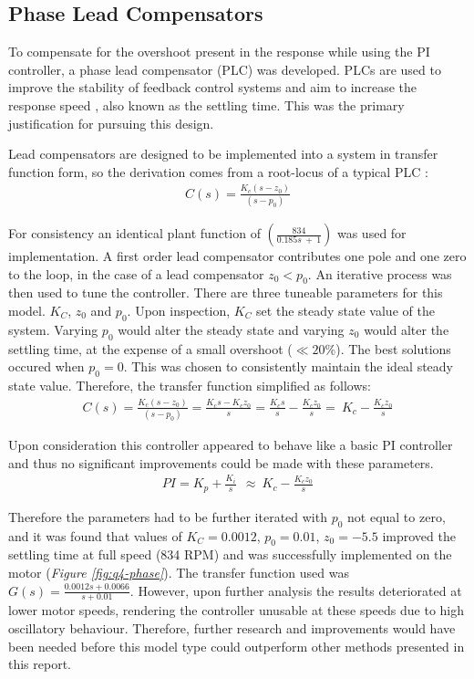 \documentclass[11pt, onecolumn]{article}
\begin{document}
\subsection*{Phase Lead Compensators}
\par To compensate for the overshoot present in the response while using the PI controller, a phase lead compensator (PLC) was developed. PLCs are used to improve the stability of feedback control systems and aim to increase the response speed \cite{sciencedirectLeadCompensator}, also known as the settling time. This was the primary justification for pursuing this design.
\par Lead compensators are designed to be implemented into a system in transfer function form, so the derivation comes from a root-locus of a typical PLC \cite{umichControlTutorials1}:
\begin{align*}
    C(s)=\frac{K_c(s-z_0)}{(s-p_0)}
\end{align*}
\par For consistency an identical plant function  of $(\frac{834}{0.185s\ +\ 1})$ was used for implementation. A first order lead compensator contributes one pole and one zero to the loop, in the case of a lead compensator $z_0<p_0$. An iterative process was then used to tune the controller. There are three tuneable parameters for this model. $K_C$, $z_0$ and $p_0$. Upon inspection, $K_C$ set the steady state value of the system. Varying $p_0$ would alter the steady state and varying $z_0$ would alter the settling time, at the expense of a small overshoot ($\ll20$\%). The best solutions occured when $p_0=0$. This was chosen to consistently maintain the ideal steady state value. Therefore, the transfer function simplified as follows:
\begin{align*}
    C\left(s\right)=\frac{K_c\left(s-z_0\right)}{(s-p_0)}=\frac{K_cs-K_cz_0}{s}=\frac{K_cs}{s}-\frac{K_cz_0}{s}=\ K_c-\frac{K_cz_0}{s}
\end{align*}
\par Upon consideration this controller appeared to behave like a basic PI controller and thus no significant improvements could be made with these parameters.
\begin{align*}
    PI=K_p+\frac{K_i}{s}\ \ \approx\ K_c-\frac{K_cz_0}{s}
\end{align*}
\par Therefore the parameters had to be further iterated with $p_0$ not equal to zero, and it was found that values of $K_C = 0.0012$, $p_0= 0.01$, $z_0= -5.5$ improved the settling time at full speed (834 RPM) and was successfully implemented on the motor (\textit{Figure \ref{fig:q4-phase}}). The transfer function used was $G(s)= \frac{0.0012s + 0.0066}{s+0.01}$. However, upon further analysis the results deteriorated at lower motor speeds, rendering the controller unusable at these speeds due to high oscillatory behaviour. Therefore, further research and improvements would have been needed before this model type could outperform other methods presented in this report.
\end{document}
